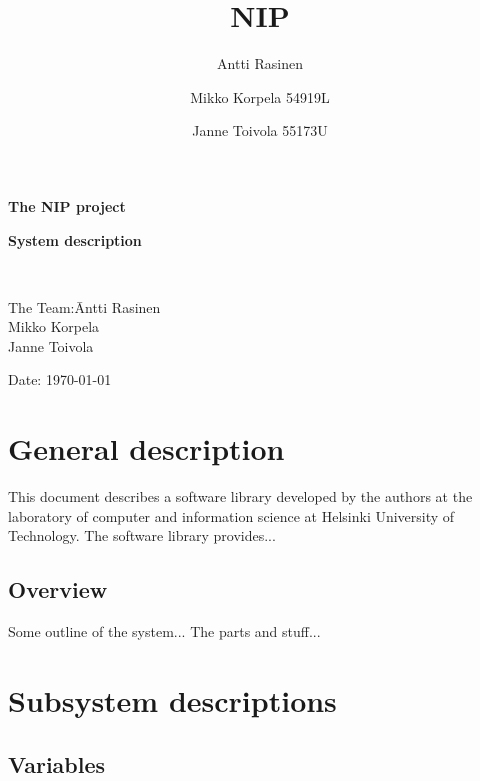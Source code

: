 \documentclass[12pt,a4paper]{report}
\title{NIP}
\author{Antti Rasinen}
\author{Mikko Korpela 54919L}
\author{Janne Toivola 55173U}
\begin{document}
\pagestyle{empty}
\setlength{\parindent}{0mm}
\setlength{\parskip}{3mm}

\large
\textbf{The NIP project}\\

\vspace{45mm}

\begin{centering}
\huge
\textbf{System description}\\ %
\end{centering}

\parbox{5cm}{\ }
\parbox{1em}{\vskip8cm}

\normalsize
\vspace{5mm}
\begin{tabbing}
The Team:\= Antti Rasinen\\
         \> Mikko Korpela\\
         \> Janne Toivola\\
\vspace{5mm}

\end{tabbing}
Date: \today
\eject\newpage

\pagestyle{plain}

\tableofcontents

%


\newpage
\chapter{General description}
This document describes a software library developed by 
the authors at the laboratory of computer and information science at 
Helsinki University of Technology. The software library provides...


\section{Overview}
Some outline of the system... The parts and stuff...



\newpage
\chapter{Subsystem descriptions}
\section{Variables}
\end{document}
